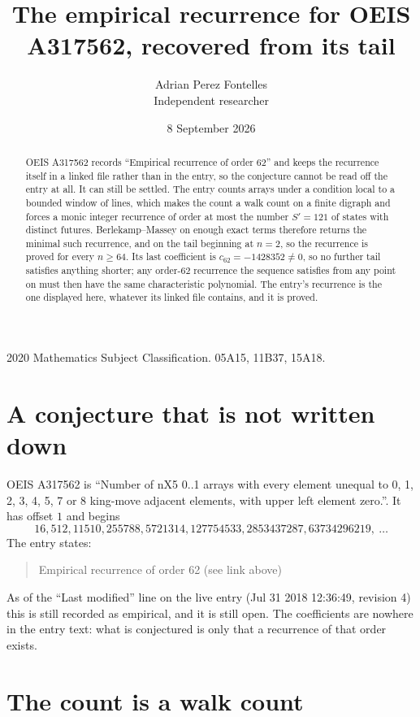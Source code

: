 \documentclass[11pt,a4paper]{article}
\title{The empirical recurrence for OEIS A317562, recovered from its tail}
\author{Adrian Perez Fontelles\\ \small Independent researcher}
\date{8 September 2026}
\theoremstyle{plain}
\theoremstyle{definition}
\begin{document}
\maketitle

\begin{abstract}
OEIS A317562 records ``Empirical recurrence of order $62$'' and keeps the recurrence itself in
a linked file rather than in the entry, so the conjecture cannot be read off the entry at all.
It can still be settled. The entry counts arrays under a condition local to a bounded window of
lines, which makes the count a walk count on a finite digraph and forces a monic integer
recurrence of order at most the number $S'=121$ of states with distinct futures. Berlekamp--Massey on
enough exact terms therefore returns the minimal such recurrence, and on the tail beginning at $n=2$, so the recurrence is proved for every $n\ge64$.
Its last coefficient is $c_{62}=-1428352\neq0$, so no further tail satisfies anything
shorter; any order-$62$ recurrence the sequence satisfies from any point on must then have
the same characteristic polynomial. The entry's recurrence is the one displayed here, whatever
its linked file contains, and it is proved.
\end{abstract}

\noindent\small 2020 Mathematics Subject Classification. 05A15, 11B37, 15A18.\normalsize

\section{A conjecture that is not written down}

OEIS A317562 is ``Number of nX5 0..1 arrays with every element unequal to 0, 1, 2, 3, 4, 5, 7 or 8 king-move adjacent elements, with upper left element zero.''. It has offset $1$ and begins
\[
16, 512, 11510, 255788, 5721314, 127754533, 2853437287, 63734296219,\ \dots
\]
The entry states:
\begin{quote}
Empirical recurrence of order 62 (see link above)
\end{quote}
As of the ``Last modified'' line on the live entry (Jul 31 2018 12:36:49, revision 4)
this is still recorded as empirical, and it is still open. The coefficients are nowhere in the
entry text: what is conjectured is only that a recurrence of that order exists.

\section{The count is a walk count}
\end{document}
